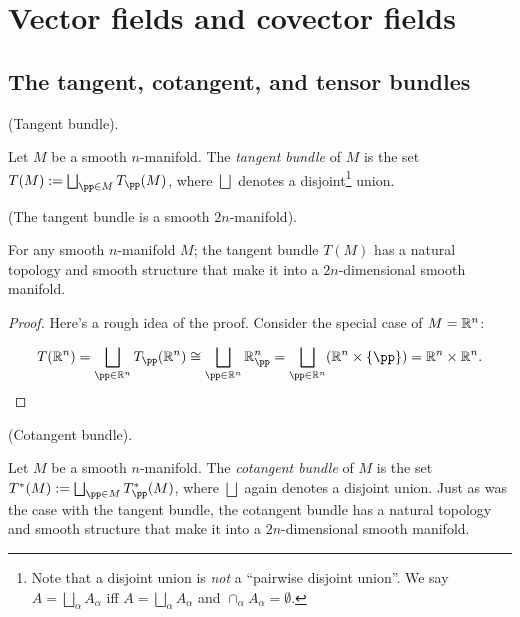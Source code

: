 \section{Vector fields and covector fields}

\subsection*{The tangent, cotangent, and tensor bundles}

\begin{defn}
     (Tangent bundle).
    
    Let $M$ be a smooth $n$-manifold. The \textit{tangent bundle} of $M$ is the set $T(M) := \bigsqcup_{\pp \in M} T_\pp(M)$, where $\bigsqcup$ denotes a disjoint\footnote{Note that a disjoint union is \textit{not} a ``pairwise disjoint union''. We say $A = \bigsqcup_\alpha A_\alpha$ iff $A = \bigsqcup_\alpha A_\alpha$ and $\cap_\alpha A_\alpha = \emptyset$.} union.
\end{defn}

\begin{theorem}
     (The tangent bundle is a smooth $2n$-manifold).
    
    For any smooth $n$-manifold $M$; the tangent bundle $T(M)$ has a natural topology and smooth structure that make it into a $2n$-dimensional smooth manifold.
\end{theorem}

\begin{proof}
    Here's a rough idea of the proof. Consider the special case of $M = \mathbb{R}^n$:
        
    \begin{align*}
        T(\R^n) = \bigsqcup_{\pp \in \R^n} T_\pp(\R^n) \cong \bigsqcup_{\pp \in \R^n} \R^n_\pp = \bigsqcup_{\pp \in \R^n} ( \R^n \times \{\pp\}) = \R^n \times \R^n.
    \end{align*}
\end{proof}

\begin{defn}
     (Cotangent bundle).
    
    Let $M$ be a smooth $n$-manifold. The \textit{cotangent bundle} of $M$ is the set $T^*(M) := \bigsqcup_{\pp \in M} T_\pp^*(M)$, where $\bigsqcup$ again denotes a disjoint union. Just as was the case with the tangent bundle, the cotangent bundle has a natural topology and smooth structure that make it into a $2n$-dimensional smooth manifold.
\end{defn}

